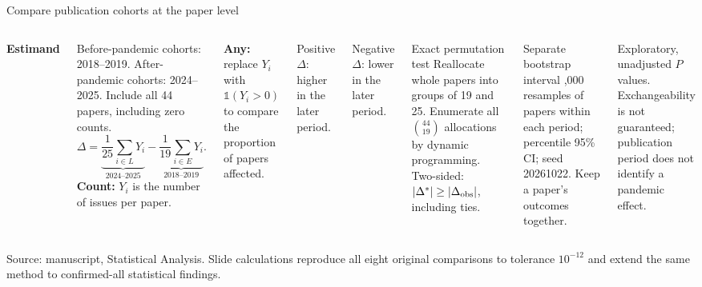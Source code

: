 \documentclass[10pt,aspectratio=169]{beamer}
\newcommand{\src}[1]{\par\vfill{\color{Slate}\fontsize{6.5}{8}\selectfont #1\par}}
\newcommand{\smalltext}{\fontsize{8.5}{10.4}\selectfont}
\begin{document}
\begin{frame}[t]{Compare publication cohorts at the paper level}
\begin{columns}[T,onlytextwidth]
\textbf{Estimand}\par
\small
Before-pandemic cohorts: 2018--2019. After-pandemic cohorts: 2024--2025. Include all 44 papers, including zero counts.
\[
\Delta=\underbrace{\frac{1}{25}\sum_{i\in L}Y_i}_{\text{2024--2025}}-
\underbrace{\frac{1}{19}\sum_{i\in E}Y_i}_{\text{2018--2019}}.
\]
\small
\textbf{Count:} $Y_i$ is the number of issues per paper.\par\medskip
\textbf{Any:} replace $Y_i$ with $\mathbb{1}(Y_i>0)$ to compare the proportion of papers affected.\par\medskip
Positive $\Delta$: higher in the later period.\par
Negative $\Delta$: lower in the later period.
\begin{block}{Exact permutation test}
\smalltext
Reallocate whole papers into groups of 19 and 25. Enumerate all $\binom{44}{19}$ allocations by dynamic programming. Two-sided: $|\Delta^*|\geq|\Delta_{\rm obs}|$, including ties.
\end{block}
\begin{block}{Separate bootstrap interval}
\smalltext
20,000 resamples of papers within each period; percentile 95\% CI; seed 20261022. Keep a paper's outcomes together.
\end{block}
\smalltext
Exploratory, unadjusted $P$ values. Exchangeability is not guaranteed; publication period does not identify a pandemic effect.
\end{columns}
\src{Source: manuscript, Statistical Analysis. Slide calculations reproduce all eight original comparisons to tolerance $10^{-12}$ and extend the same method to confirmed-all statistical findings.}
\end{frame}
\end{document}
